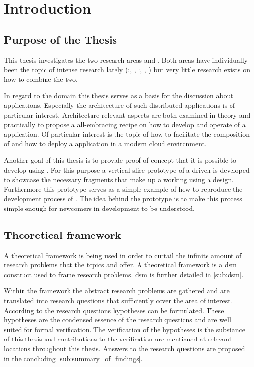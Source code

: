 \chapter{Introduction}

\section{Purpose of the Thesis}

This thesis investigates the two research areas \mss{} and
\ogs{}. Both areas have individually been the topic of intense research lately
(\mss{}:\cite{zimmermann2016microservices}, \cite{di2017research},
\ogs{}:\cite{bosch2017towards}, \cite{smed2017algorithms},
\cite{liu2017apparatus}) but very little research exists on how to combine the
two.

In regard to the \mss{} domain this thesis serves as a basis for the discussion
about \ms{} applications. Especially the architecture of such distributed \ms{}
applications is of particular interest. Architecture relevant aspects are
both examined in theory and practically to propose a all-embracing recipe on how
to develop and operate of a \ms{} application. Of particular interest is the
topic of how to facilitate the composition of \mss{} and how to deploy a \ms{}
application in a modern cloud environment.

Another goal of this thesis is to provide proof of concept that it is possible
to develop \ogs{} using \mss{}. For this purpose a vertical slice prototype of a
\ms{} driven \og{} is developed to showcase the necessary fragments that make up
a working \og{} using a \ms{} design. Furthermore this prototype serves as a
simple example of how to reproduce the development process of \ogs{}. The idea
behind the prototype is to make this process simple enough for newcomers in
\og{} development to be understood.


\section{Theoretical framework}
\label{sec:theoretical_framework}

A theoretical framework is being used in order to curtail the infinite amount of
research problems that the topics \ogs{} and \mss{} offer. A theoretical
framework is a \gls{dsm} construct used to frame research problems. \gls{dsm} is
further detailed in \autoref{sub:dsm}.

Within the framework the abstract research problems are gathered and are
translated into research questions that sufficiently cover the area of interest.
According to the research questions hypotheses can be formulated. These
hypotheses are the condensed essence of the research questions and are well
suited for formal verification. The verification of the hypotheses is the
substance of this thesis and contributions to the verification are mentioned at
relevant locations throughout this thesis. Answers to the research questions
are proposed in the concluding \autoref{sub:summary_of_findings}.


